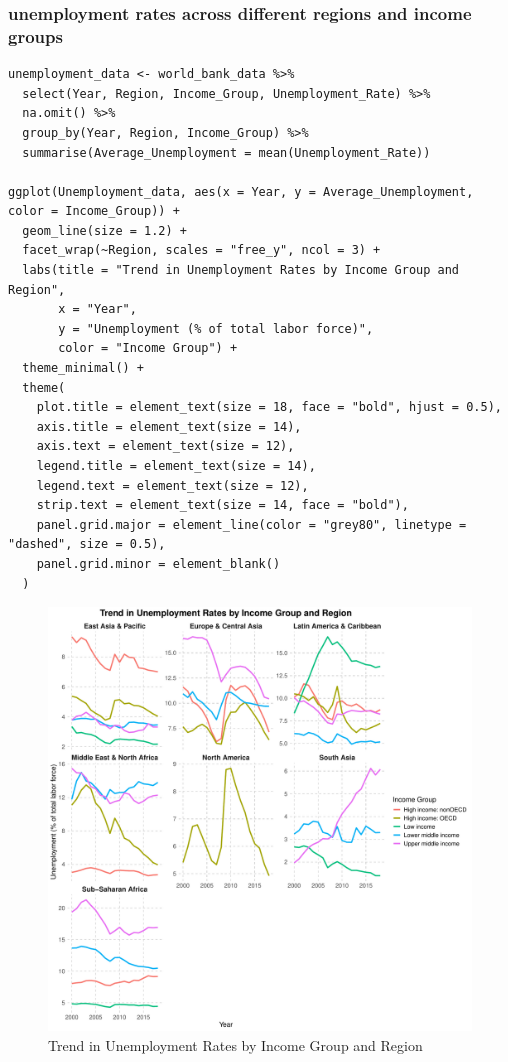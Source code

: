 \documentclass{article}\usepackage[]{graphicx}\usepackage[]{xcolor}
\makeatletter
\def\maxwidth{ %
  \ifdim\Gin@nat@width>\linewidth
    \linewidth
  \else
    \Gin@nat@width
  \fi
}
\newenvironment{knitrout}{}{} %
\makeatother
\begin{document}
\subsubsection{unemployment rates across different regions and income groups}
\begin{lstlisting}
unemployment_data <- world_bank_data %>%
  select(Year, Region, Income_Group, Unemployment_Rate) %>%
  na.omit() %>%
  group_by(Year, Region, Income_Group) %>%
  summarise(Average_Unemployment = mean(Unemployment_Rate))

ggplot(Unemployment_data, aes(x = Year, y = Average_Unemployment, color = Income_Group)) +
  geom_line(size = 1.2) + 
  facet_wrap(~Region, scales = "free_y", ncol = 3) + 
  labs(title = "Trend in Unemployment Rates by Income Group and Region",
       x = "Year",
       y = "Unemployment (% of total labor force)",
       color = "Income Group") +
  theme_minimal() +
  theme(
    plot.title = element_text(size = 18, face = "bold", hjust = 0.5), 
    axis.title = element_text(size = 14), 
    axis.text = element_text(size = 12), 
    legend.title = element_text(size = 14), 
    legend.text = element_text(size = 12), 
    strip.text = element_text(size = 14, face = "bold"), 
    panel.grid.major = element_line(color = "grey80", linetype = "dashed", size = 0.5),
    panel.grid.minor = element_blank() 
  ) 

\end{lstlisting}
\begin{figure}[h!]
\centering
\begin{knitrout}
\color{fgcolor}
\includegraphics[width=\maxwidth]{figure/unnamed-chunk-6-1} 
\end{knitrout}
\caption{Trend in Unemployment Rates by Income Group and Region}
\label{fig}
\end{figure}
\end{document}
